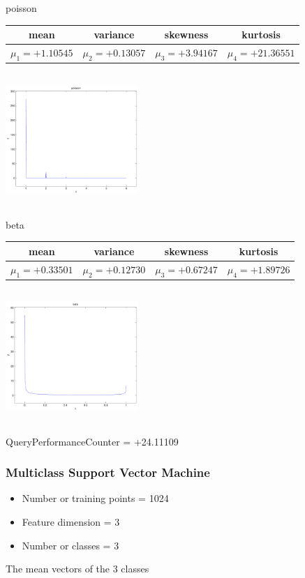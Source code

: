 \documentclass[9pt]{article}
\theoremstyle{plain}
\theoremstyle{definition}
\theoremstyle{remark}
\numberwithin{equation}{section}
\begin{document}
poisson \begin{tabular}{|c|c|c|c|}  mean & variance & skewness & kurtosis \\  \hline
$\mu_1 = +1.10545$ & $\mu_2 = +0.13057$ & $\mu_3 = +3.94167$ & $\mu_4 =+21.36551$ \\
\end{tabular}

\includegraphics[width=5cm,height=5cm]{poisson.pdf}

\newpage
beta \begin{tabular}{|c|c|c|c|}  mean & variance & skewness & kurtosis \\  \hline
$\mu_1 = +0.33501$ & $\mu_2 = +0.12730$ & $\mu_3 = +0.67247$ & $\mu_4 =+1.89726$ \\
\end{tabular}

\includegraphics[width=5cm,height=5cm]{beta.pdf}

QueryPerformanceCounter  =  +24.11109
\subsubsection{Multiclass Support Vector Machine }
\begin{itemize}
\item Number or training points = 1024
\item Feature dimension = 3
\item Number or classes = 3
\end{itemize}
{The mean vectors of the 3 classes}
\end{document}
